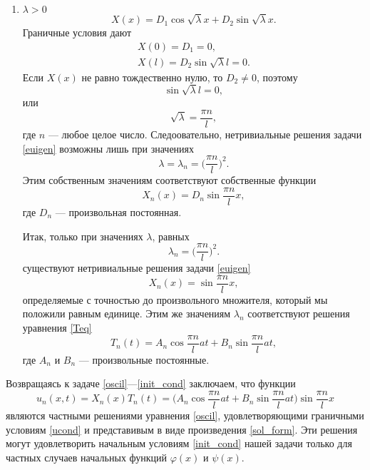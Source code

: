 \begin{enumerate}
	\item $\lambda > 0$
	\begin{equation*}
		X(x) = D_1 \cos{\sqrt{\lambda} x} + D_2 \sin{\sqrt{\lambda} x}.
	\end{equation*}
	Граничные условия дают
	\begin{align*}
		X(0) = D_1 = 0, \\
		X(l) = D_2 \sin{\sqrt{\lambda}l} = 0. 
	\end{align*}
	Если $X(x)$ не равно тождественно нулю, то $D_2 \not = 0$, поэтому 
	\begin{equation*}
		\sin{\sqrt{\lambda}l} = 0,
	\end{equation*}
	или
	\begin{equation*}
		\sqrt{\lambda} = \frac{\pi n}{l},
	\end{equation*}
	где $n$ --- любое целое число. Следоовательно, нетривиальные решения задачи \eqref{euigen} возможны лишь при значениях 
	\begin{equation*}
		\lambda = \lambda_n = \Big(\frac{\pi n}{l}\Big)^2.
	\end{equation*}
	Этим собственным значениям соответствуют собственные функции \begin{equation*}
		X_n(x) = D_n \sin{\frac{\pi n}{l} x},
	\end{equation*}
	где $D_n$ --- произвольная постоянная.
	
	
	Итак, только при значениях $\lambda$, равных
	\begin{equation*}
		\lambda_n = \Big(\frac{\pi n}{l}\Big)^2.
	\end{equation*}
	существуют нетривиальные решения задачи \eqref{euigen}
	\begin{equation*}
		X_n(x) = \sin{\frac{\pi n}{l} x},
	\end{equation*}
	определяемые с точностью до произвольного множителя, который мы положили равным единице. Этим же значениям $\lambda_n$ соответствуют решения уравнения \eqref{Teq}
	\begin{equation*}
		T_n(t) = A_n \cos{\frac{\pi n}{l} a t} + B_n \sin{\frac{\pi n}{l} a t},
	\end{equation*}
	где $A_n$ и $B_n$ --- произвольные постоянные.
\end{enumerate}
	
Возвращаясь к задаче \eqref{oscil}---\eqref{init_cond} заключаем, что функции 
	\begin{equation*}
		u_n(x, t) = X_n(x) T_n(t) = \Big(A_n \cos{\frac{\pi n}{l} a t} + B_n \sin{\frac{\pi n}{l} a t}\Big) \sin{\frac{\pi n}{l} x}
	\end{equation*}
	являются частными решениями уравнения \eqref{oscil}, удовлетворяющими граничными условиям \eqref{ucond} и представивым в виде произведения \eqref{sol_form}. Эти решения могут удовлетворить начальным условиям \eqref{init_cond} нашей задачи только для частных случаев начальных функций $\varphi(x)$ и $\psi(x)$.
	
